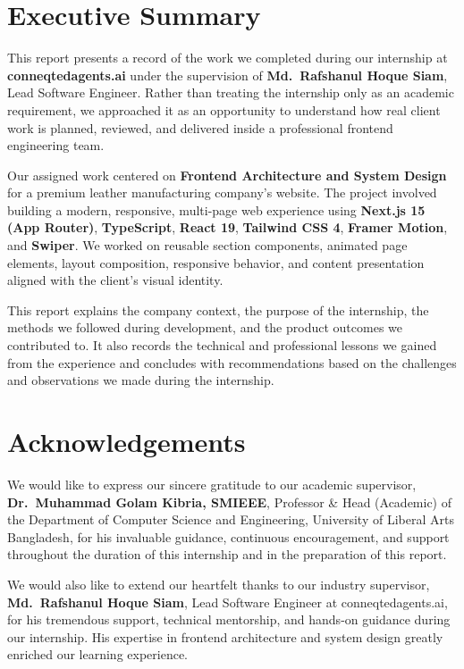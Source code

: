 \documentclass[12pt, oneside, a4paper]{book}
\begin{document}
\begin{doublespace}

\chapter*{Executive Summary}

This report presents a record of the work we completed during our internship at
\textbf{conneqtedagents.ai} under the supervision of \textbf{Md.\ Rafshanul Hoque
Siam}, Lead Software Engineer. Rather than treating the internship only as an academic
requirement, we approached it as an opportunity to understand how real client work is
planned, reviewed, and delivered inside a professional frontend engineering team.

Our assigned work centered on \textbf{Frontend Architecture and System Design} for a
premium leather manufacturing company's website. The project involved building a modern,
responsive, multi-page web experience using \textbf{Next.js 15 (App Router)},
\textbf{TypeScript}, \textbf{React 19}, \textbf{Tailwind CSS 4}, \textbf{Framer Motion},
and \textbf{Swiper}. We worked on reusable section components, animated page elements,
layout composition, responsive behavior, and content presentation aligned with the
client's visual identity.

This report explains the company context, the purpose of the internship, the methods we
followed during development, and the product outcomes we contributed to. It also records
the technical and professional lessons we gained from the experience and concludes with
recommendations based on the challenges and observations we made during the internship.

\cleardoublepage

\chapter*{Acknowledgements}

We would like to express our sincere gratitude to our academic supervisor,
\textbf{Dr.\ Muhammad Golam Kibria, SMIEEE}, Professor \& Head (Academic) of the
Department of Computer Science and Engineering, University of Liberal Arts Bangladesh,
for his invaluable guidance, continuous encouragement, and support throughout the
duration of this internship and in the preparation of this report.

We would also like to extend our heartfelt thanks to our industry supervisor,
\textbf{Md.\ Rafshanul Hoque Siam}, Lead Software Engineer at conneqtedagents.ai,
for his tremendous support, technical mentorship, and hands-on guidance during our
internship. His expertise in frontend architecture and system design greatly enriched
our learning experience.


\end{doublespace}
\end{document}
